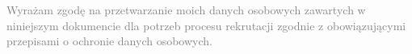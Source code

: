 \vfill
\begin{center}
	\begin{minipage}{0.9\textwidth}
		\footnotesize\textcolor{gray}{
			Wyrażam zgodę na przetwarzanie moich danych osobowych zawartych w niniejszym dokumencie dla potrzeb procesu rekrutacji zgodnie z obowiązującymi przepisami o ochronie danych osobowych.
		}
	\end{minipage}
\end{center}
